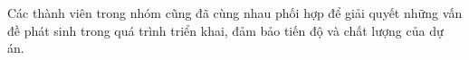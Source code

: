 \documentclass[a4paper,12pt]{article}
\begin{document}
Các thành viên trong nhóm cũng đã cùng nhau phối hợp để giải quyết những vấn đề phát sinh trong quá trình triển khai, đảm bảo tiến độ và chất lượng của dự án.






















\end{document}
